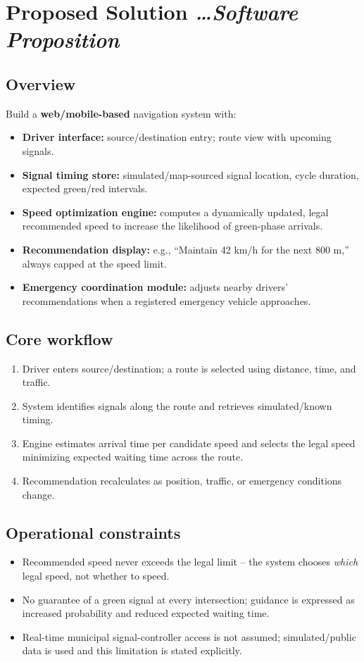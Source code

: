 \documentclass[11pt,a4paper]{article}
\newcommand{\BvrHint}[1]{%
  {\normalfont\normalsize\itshape\hfill #1}}
\begin{document}
\section{Proposed Solution %
\BvrHint{\ldots Software Proposition}}
\subsection{Overview}
Build a \textbf{web/mobile-based} navigation system with:
\begin{itemize}[leftmargin=0.7cm]
    \item \textbf{Driver interface:} source/destination entry; route view with upcoming signals.
    \item \textbf{Signal timing store:} simulated/map-sourced signal location, cycle duration, expected green/red intervals.
    \item \textbf{Speed optimization engine:} computes a dynamically updated, legal recommended speed to increase the likelihood of green-phase arrivals.
    \item \textbf{Recommendation display:} e.g., ``Maintain 42 km/h for the next 800 m,'' always capped at the speed limit.
    \item \textbf{Emergency coordination module:} adjusts nearby drivers' recommendations when a registered emergency vehicle approaches.
\end{itemize}

\subsection{Core workflow}
\begin{enumerate}[leftmargin=0.7cm]
    \item Driver enters source/destination; a route is selected using distance, time, and traffic.
    \item System identifies signals along the route and retrieves simulated/known timing.
    \item Engine estimates arrival time per candidate speed and selects the legal speed minimizing expected waiting time across the route.
    \item Recommendation recalculates as position, traffic, or emergency conditions change.
\end{enumerate}

\subsection{Operational constraints}
\begin{itemize}[leftmargin=0.7cm]
    \item Recommended speed never exceeds the legal limit -- the system chooses \emph{which} legal speed, not whether to speed.
    \item No guarantee of a green signal at every intersection; guidance is expressed as increased probability and reduced expected waiting time.
    \item Real-time municipal signal-controller access is not assumed; simulated/public data is used and this limitation is stated explicitly.
\end{itemize}
\end{document}
